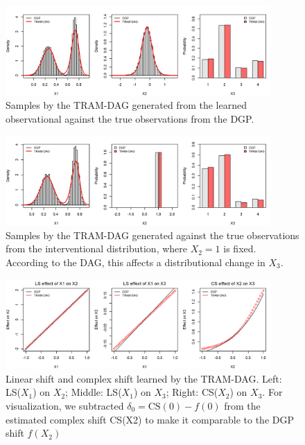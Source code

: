 \begin{figure}[htbp]
\centering
\includegraphics[width=0.9\textwidth]{img/exp1_observational_distribution.png}
\caption{Samples by the TRAM-DAG generated from the learned observational against the true observations from the DGP.}
\label{fig:exp1_observational_distribution}
\end{figure}




\begin{figure}[htbp]
\centering
\includegraphics[width=0.9\textwidth]{img/exp1_interventional_distribution.png}
\caption{Samples by the TRAM-DAG generated against the true observations from the interventional distribution, where $X_2 = 1$ is fixed. According to the DAG, this affects a distributional change in $X_3$.}
\label{fig:exp1_interventional_distribution}
\end{figure}



\begin{figure}[htbp]
\centering
\includegraphics[width=0.9\textwidth]{img/exp1_LS_CS.png}
\caption{Linear shift and complex shift learned by the TRAM-DAG. Left: LS($X_1$) on $X_2$; Middle: LS($X_1$) on $X_3$; Right: CS($X_2$) on $X_3$. For visualization, we subtracted $\delta_0 = \text{CS}(0) - f(0)$ from the estimated complex shift CS(X2) to make it comparable to the DGP shift $f(X_2)$}
\label{fig:exp1_shifts}
\end{figure}



